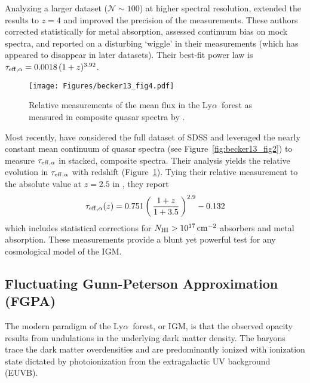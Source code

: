 \documentclass[graybox]{svmult}
\def\lya{Ly$\alpha$}
\def\ltp{\left ( \,}
\def\rtp{\, \right  ) }
\newcommand{\mnhi}{N_{\rm HI}}
\def\cm#1{\, {\rm cm^{#1}}}
\begin{document}
Analyzing a larger dataset ($\mathcal{N} \sim 100$)
at higher spectral
resolution, \cite{fg08} extended the results
to $z=4$ and improved the precision of the
measurements.  These authors
corrected statistically for metal absorption,
assessed continuum bias on mock spectra, and
reported on a disturbing `wiggle' in their measurements
(which has appeared to disappear in later datasets).
Their best-fit power law
is $\tau_{\rm eff, \alpha} = 0.0018 \, (1+z)^{3.92}$.

%
\begin{figure}[b]
\sidecaption
\texttt{[image: Figures/becker13\_fig4.pdf]}
%
%
\caption{Relative measurements of the mean flux in the 
\lya\ forest as measured in composite quasar spectra
by \cite{becker+13}.
}
\label{fig:rel_teff}       %
\end{figure}

Most recently, \cite{becker+13} have considered the full dataset
of SDSS and leveraged the nearly constant mean continuum of
quasar spectra (see Figure~\ref{fig:becker13_fig2}) to
measure $\tau_{\rm eff,\alpha}$ in stacked, composite spectra.
Their analysis yields the relative evolution in $\tau_{\rm eff,\alpha}$
with redshift (Figure~\ref{fig:rel_teff}).
Tying their relative measurement to the absolute value at
$z=2.5$ in \cite{fg08}, they report
\begin{equation}
\tau_{\rm eff, \alpha}(z) = 0.751 \ltp \frac{1+z}{1+3.5} 
\rtp^{2.9}  - 0.132
\end{equation}
which includes
statistical corrections for $\mnhi > 10^{17} \cm{-2}$ absorbers 
and metal absorption.
These measurements provide a blunt yet powerful test
for any cosmological model of the IGM.

\subsection{Fluctuating Gunn-Peterson Approximation (FGPA)}
The modern paradigm of the \lya\ forest, or IGM,
is that the observed opacity results from undulations
in the underlying dark matter density.  The baryons
trace the dark matter overdensities and are predominantly
ionized with ionization state dictated by photoionization
from the extragalactic UV background (EUVB).
\end{document}
